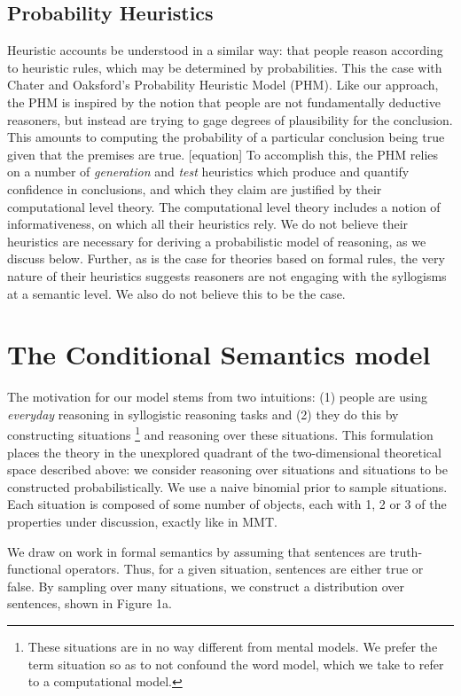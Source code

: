 \documentclass[10pt,letterpaper]{article}
\begin{document}
\subsection{Probability Heuristics}

Heuristic accounts be understood in a similar way: that people reason according to heuristic rules, which may be determined by probabilities. This the case with Chater and Oaksford's Probability Heuristic Model (PHM). Like our approach, the PHM is inspired by the notion that people are not fundamentally deductive reasoners, but instead are trying to gage degrees of plausibility for the conclusion. This amounts to computing the probability of a particular conclusion being true given that the premises are true. [equation] To accomplish this, the PHM relies on a number of {\em generation} and {\em test} heuristics which produce and quantify confidence in conclusions, and which they claim are justified by their computational level theory. The computational level theory includes a notion of informativeness, on which all their heuristics rely. We do not believe their heuristics are necessary for deriving a probabilistic model of reasoning, as we discuss below. Further, as is the case for theories based on formal rules, the very nature of their heuristics suggests reasoners are not engaging with the syllogisms at a semantic level. We also do not believe this to be the case. 


\section{The Conditional Semantics model}

The motivation for our model stems from two intuitions: (1) people are using \emph{everyday} reasoning in syllogistic reasoning tasks and (2) they do this by constructing situations \footnote{These situations are in no way different from mental models. We prefer the term situation so as to not confound the word model, which we take to refer to a computational model.} and reasoning over these situations. This formulation places the theory in the unexplored quadrant of the two-dimensional theoretical space described above: we consider reasoning over situations and situations to be constructed probabilistically. We use a naive binomial prior to sample situations. Each situation is composed of some number of objects, each with 1, 2 or 3 of the properties under discussion, exactly like in MMT. 

We draw on work in formal semantics by assuming that sentences are truth-functional operators. Thus, for a given situation, sentences are either true or false. By sampling over many situations, we construct a distribution over sentences, shown in Figure 1a.
\end{document}
